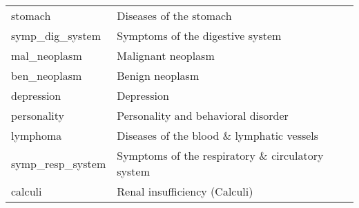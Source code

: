 \begin{table}[H]
\begin{tabular}{ll}
	\hspace{4pt} stomach  &       Diseases of the stomach \\
	\hspace{4pt} symp\_dig\_system  &       Symptoms of the digestive system \\
	\hspace{4pt} mal\_neoplasm  &       Malignant neoplasm \\
	\hspace{4pt} ben\_neoplasm  &       Benign neoplasm \\
	\hspace{4pt} depression  &       Depression \\
	\hspace{4pt} personality  &       Personality and behavioral disorder \\
	\hspace{4pt} lymphoma  &       Diseases of the blood \& lymphatic vessels \\
	\hspace{4pt} symp\_resp\_system  &       Symptoms of the respiratory \& circulatory system \\
	\hspace{4pt} calculi  &       Renal insufficiency (Calculi) \\
\bottomrule
\end{tabular}
\end{table}